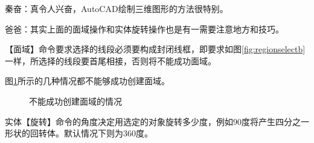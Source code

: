 秦奋：真令人兴奋，AutoCAD绘制三维图形的方法很特别。

爸爸：其实上面的面域操作和实体旋转操作也是有一需要注意地方和技巧。
\begin{tips}
\item 【面域】命令要求选择的线段必须要构成封闭线框，即要求如图\ref{fig:regionselectb}一样，所选择的线段要首尾相接，否则将不能成功面域。
\item 图\ref{fig:buchengong}所示的几种情况都不能够成功创建面域。
\begin{figure}[htbp]
\centering
{}\hspace{20pt}
\hspace{20pt}
\hspace{20pt}
\caption{不能成功创建面域的情况}\label{fig:buchengong}
\end{figure}
\item 实体【旋转】命令的角度决定用选定的对象旋转多少度，例如90度将产生四分之一形状的回转体。默认情况下则为360度。
\end{tips}
\endinput